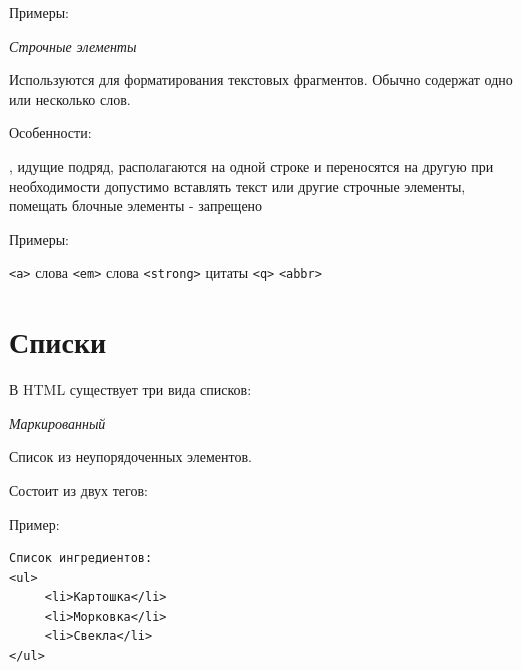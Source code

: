 \documentclass[14pt]{extreport}
\begin{document}
Примеры:

\emph{Строчные элементы}

Используются для форматирования текстовых фрагментов. Обычно содержат одно или несколько слов.

Особенности:
\begin{itemize}
, идущие подряд, располагаются на одной строке и переносятся на другую при необходимости
 допустимо вставлять текст или другие строчные элементы, помещать блочные элементы - запрещено
\end{itemize}

Примеры:
\begin{itemize}
 \texttt{<a>}
 слова \texttt{<em>}
 слова \texttt{<strong>}
 цитаты \texttt{<q>}
 \texttt{<abbr>}
\end{itemize}




\section{Списки}

В HTML существует три вида списков:

\emph{Маркированный}

Список из неупорядоченных элементов.

Состоит из двух тегов:

Пример:

\begin{verbatim}
Список ингредиентов:
<ul>
     <li>Картошка</li>
     <li>Морковка</li>
     <li>Свекла</li>
</ul>
\end{verbatim}
\end{document}
